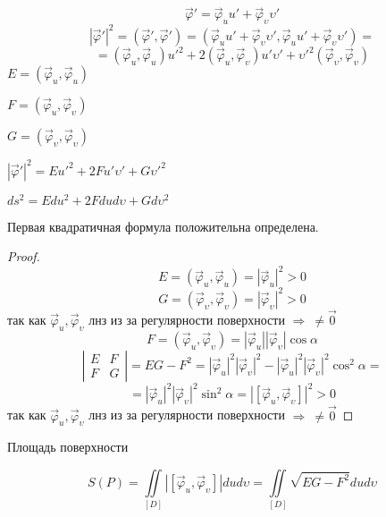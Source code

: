 \begin{define}
  $$
  \vec \varphi' = \vec \varphi_u u' + \vec \varphi_{\upsilon} \upsilon'
  $$
  $$
  |\vec \varphi'|^2 = (\vec \varphi', \vec \varphi') =
  (\vec \varphi_u u' + \vec \varphi_{\upsilon} \upsilon', \vec \varphi_u u' +
  \vec \varphi_{\upsilon} \upsilon') =
  $$
  $$
  = (\vec \varphi_u, \vec \varphi_u)u'^2 + 2(\vec \varphi_u,
  \vec \varphi_{\upsilon}) u' \upsilon' + \upsilon'^2 (\vec \varphi_{\upsilon},
  \vec \varphi_{\upsilon})
  $$
  $E = (\vec \varphi_u, \vec \varphi_u)$

  $F = (\vec \varphi_u, \vec \varphi_{\upsilon})$

  $G = (\vec \varphi_{\upsilon}, \vec \varphi_{\upsilon})$

  $|\vec \varphi'|^2 = E u'^2 + 2Fu'\upsilon' + G\upsilon'^2$

  $ds^2 = Edu^2 + 2Fdud\upsilon + Gd\upsilon^2$
\end{define}

\begin{theorem}
  Первая квадратичная формула положительна определена.
\end{theorem}

\begin{proof}
  $$
  E = (\vec \varphi_u, \vec \varphi_u) = |\vec \varphi_u|^2 > 0
  $$
  $$
  G = (\vec \varphi_{\upsilon}, \vec \varphi_{\upsilon}) =
  |\vec \varphi_{\upsilon}|^2 > 0
  $$
  так как $\vec \varphi_u, \vec \varphi_{\upsilon}$ лнз из за регулярности
  поверхности $\Rightarrow ~ \not= \vec 0$
  $$
  F = (\vec \varphi_u, \vec \varphi_{\upsilon}) = |\vec \varphi_u|
  |\vec \varphi_{\upsilon}| \cos \alpha
  $$
  $$
  \left|
  \begin{array}{cc}
    E & F \\
    F & G
  \end{array}
  \right|
  = EG - F^2 = |\vec \varphi_u|^2|\vec \varphi_{\upsilon}|^2 -
  |\vec \varphi_u|^2 |\vec \varphi_{\upsilon}|^2 \cos^2 \alpha =
  $$
  $$
  = |\vec \varphi_u|^2
  |\vec \varphi_{\upsilon}|^2 \sin^2 \alpha = |[\vec \varphi_u, \vec
  \varphi_{\upsilon}]|^2 > 0
  $$
  так как $\vec \varphi_u, \vec \varphi_{\upsilon}$ лнз из за регулярности
  поверхности $\Rightarrow ~ \not= \vec 0$
\end{proof}

\begin{title}[\Large]
  Площадь поверхности
\end{title}

\begin{block}
  $$
  S(P) = \iint \limits_{[D]} |[\vec \varphi_u, \vec \varphi_{\upsilon}]|
  du d\upsilon = \iint \limits_{[D]} \sqrt{EG - F^2}dud\upsilon
  $$
\end{block}

